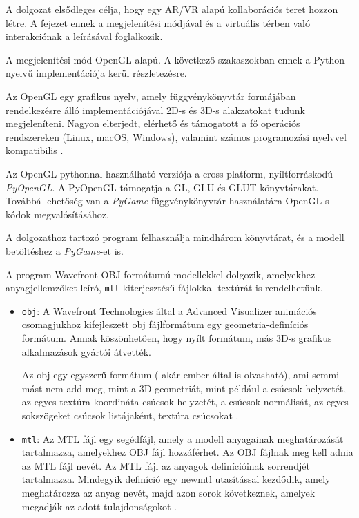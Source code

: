 


A dolgozat elsődleges célja, hogy egy AR/VR alapú kollaborációs teret hozzon létre.
A fejezet ennek a megjelenítési módjával és a virtuális térben való interakciónak a leírásával foglalkozik.


A megjelenítési mód OpenGL alapú.
A következő szakaszokban ennek a Python nyelvű implementációja kerül részletezésre.


Az OpenGL egy grafikus nyelv, amely függvénykönyvtár formájában rendelkezésre álló implementációjával 2D-s és 3D-s alakzatokat tudunk megjeleníteni. Nagyon elterjedt, elérhető és támogatott a fő operációs rendszereken (Linux, macOS, Windows), valamint számos programozási nyelvvel kompatibilis \cite{opengl}.

Az OpenGL pythonnal használható verziója a cross-platform, nyíltforráskodú \textit{PyOpenGL}. A PyOpenGL támogatja a GL, GLU és GLUT könyvtárakat.
Továbbá lehetőség van a \textit{PyGame} függvénykönyvtár használatára OpenGL-s kódok megvalósításához.

A dolgozathoz tartozó program felhasználja mindhárom könyvtárat, és a modell betöltéshez a \textit{PyGame}-et is.


A program Wavefront OBJ formátumú modellekkel dolgozik, amelyekhez anyagjellemzőket leíró, \texttt{mtl} kiterjesztésű fájlokkal textúrát is rendelhetünk. 
\begin{itemize}
\item \texttt{obj}: A Wavefront Technologies által a Advanced Visualizer animációs csomagjukhoz kifejleszett obj fájlformátum egy geometria-definíciós formátum. 
Annak köszönhetően, hogy nyílt formátum, más 3D-s grafikus alkalmazások gyártói átvették.

Az obj egy egyszerű formátum ( akár ember által is olvasható), ami semmi mást nem add meg, mint a 3D geometriát, mint például a csúcsok helyzetét, az egyes textúra koordináta-csúcsok helyzetét, a csúcsok normálisát, az egyes sokszögeket csúcsok listájaként, textúra csúcsokat \cite{obj}.

\item \texttt{mtl}: Az MTL fájl egy segédfájl, amely a modell anyagainak meghatározását tartalmazza, amelyekhez OBJ fájl hozzáférhet. Az OBJ fájlnak meg kell adnia az MTL fájl nevét. Az MTL fájl az anyagok definícióinak sorrendjét tartalmazza. Mindegyik definíció egy newmtl utasítással kezdődik, amely meghatározza az anyag nevét, majd azon sorok következnek, amelyek megadják az adott tulajdonságokot \cite{mtl}.
\end{itemize} 

